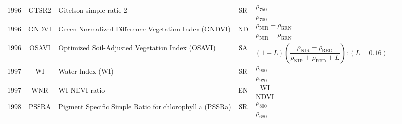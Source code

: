 \documentclass[10pt]{article}
\begin{document}
\begin{ThreePartTable}
\begin{longtable}{c c m{2.3in} c M{2.8in} M{1.5in}}
  1996 & GTSR2   & Gitelson simple ratio 2                                                        & SR & $\dfrac{\rho_{750}}{\rho_{700}}$                                                                                                                                                                                                                                                        & \citet{Gitelson1996b,Gitelson1997,Lichtenthaler1996}\\
  1996 & GNDVI   & Green Normalized Difference Vegetation Index (GNDVI)                           & ND & $\dfrac{\rho_\text{NIR}-\rho_\text{GRN}}{\rho_\text{NIR}+\rho_\text{GRN}}$                                                                                                                                                                                                              & \citet{Gitelson1996a}                               \\
  1996 & OSAVI   & Optimized Soil-Adjusted Vegetation Index (OSAVI)                               & SA & $(1 + L)\left(\dfrac{\rho_\text{NIR}-\rho_\text{RED}}{\rho_\text{NIR}+\rho_\text{RED}+L}\right):(L=0.16)$                                                                                                                                                                               & \citet{Rondeaux1996}                                \\
  1997 & WI      & Water Index (WI)                                                               & SR & $\dfrac{\rho_{900}}{\rho_{970}}$                                                                                                                                                                                                                                                        & \citet{Penuelas1997}                                \\
  1997 & WNR     & WI NDVI ratio                                                                  & EN & $\dfrac{\text{WI}}{\text{NDVI}}$                                                                                                                                                                                                                                                        & \citet{Penuelas1997}                                \\
  1998 & PSSRA   & Pigment Specific Simple Ratio for chlorophyll a (PSSRa)                        & SR & $\dfrac{\rho_{800}}{\rho_{680}}$                                                                                                                                                                                                                                                        & \citet{Blackburn1998a,Blackburn1998b}               \\

\end{longtable}
\end{ThreePartTable}
\end{document}
